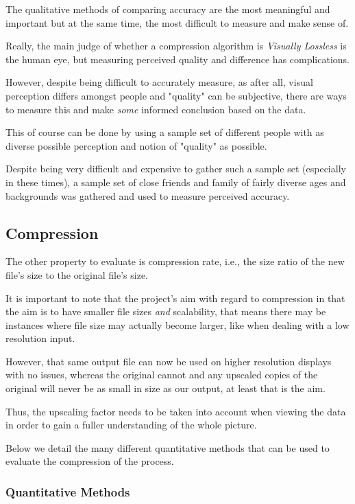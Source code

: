 \documentclass[12pt]{article}
\newcommand{\sentence}{} %
\newcommand{\italic}[1]{\textit{#1}}
\begin{document}
    \tab
    The qualitative methods of comparing accuracy are the most meaningful and important but at the same time, the
    most difficult to measure and make sense of.
    \sentence
    Really, the main judge of whether a compression algorithm is \italic{Visually Lossless} is the human eye, but
    measuring perceived quality and difference has complications.
    \sentence
    However, despite being difficult to accurately measure, as after all, visual perception differs amongst people
    and "quality" can be subjective, there are ways to measure this and make \italic{some} informed conclusion based
    on the data.
    \sentence
    This of course can be done by using a sample set of different people with as diverse possible perception and
    notion of "quality" as possible.
    \sentence
    Despite being very difficult and expensive to gather such a sample set (especially in these times), a sample set
    of close friends and family of fairly diverse ages and backgrounds was gathered and used to measure perceived
    accuracy.

    \subsection{Compression}\label{subsec:compression}

    \tab
    The other property to evaluate is compression rate, i.e., the size ratio of the new file's size to the original
    file's size.
    \sentence
    It is important to note that the project's aim with regard to compression in that the aim is to have smaller file
    sizes \italic{and} scalability, that means there may be instances where file size may actually become larger,
    like when dealing with a low resolution input.
    \sentence
    However, that same output file can now be used on higher resolution displays with no issues, whereas the original
    cannot and any upscaled copies of the original will never be as small in size as our output, at least that is the
    aim.
    \sentence
    Thus, the upscaling factor needs to be taken into account when viewing the data in order to gain a fuller
    understanding of the whole picture.
    \sentence
    Below we detail the many different quantitative methods that can be used to evaluate the compression of the process.

    \subsubsection{Quantitative Methods}\label{subsubsec:quantitative-methods2}
\end{document}
